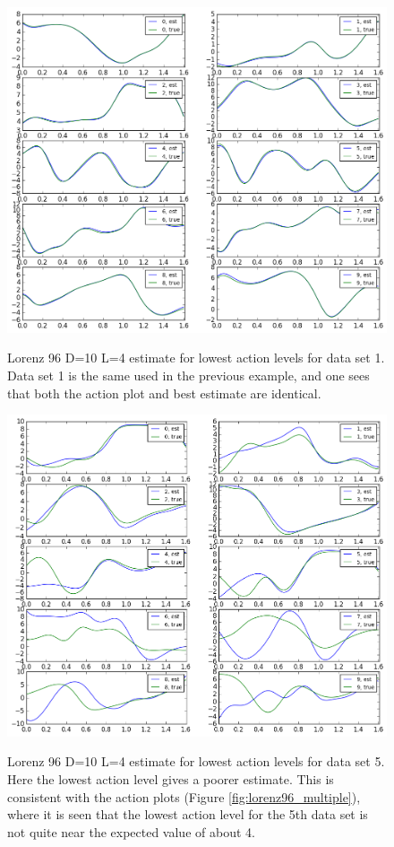 \documentclass[11pt]{article}
\begin{document}
{\begin{figure}[h]
\centering
\includegraphics[width=1\textwidth]{figure/Lorenz96_multiple/estimation_1.png} \\
\caption{Lorenz 96 D=10 L=4 estimate for lowest action levels for data set 1. Data set 1 is the same used in the previous example, and one sees that both the action plot and best estimate are identical.}
\end{figure}

\begin{figure}[h]
\centering
\includegraphics[width=1\textwidth]{figure/Lorenz96_multiple/estimation_5.png} \\
\caption{Lorenz 96 D=10 L=4 estimate for lowest action levels for data set 5. Here the lowest action level gives a poorer estimate. This is consistent with the action plots (Figure \ref{fig:lorenz96_multiple}), where it is seen that the lowest action level for the 5th data set is not quite near the expected value of about 4.}
\end{figure}


}
\end{document}

